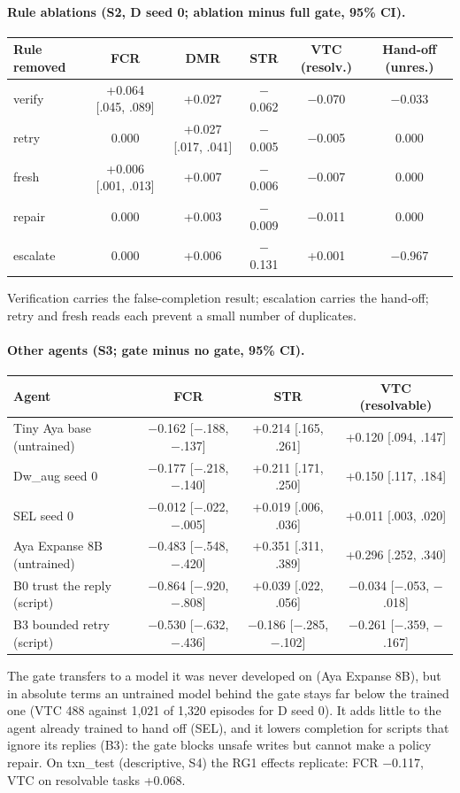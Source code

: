 \documentclass[11pt]{article}
\begin{document}
\paragraph{Rule ablations (S2, D seed 0; ablation minus full gate, 95\% CI).}
\begin{center}\footnotesize
\begin{tabular}{@{}lccccc@{}}
\toprule
Rule removed & FCR & DMR & STR & VTC (resolv.) & Hand-off (unres.) \\
\midrule
verify & +0.064 [.045, .089] & +0.027 & $-$0.062 & $-$0.070 & $-$0.033 \\
retry & 0.000 & +0.027 [.017, .041] & $-$0.005 & $-$0.005 & 0.000 \\
fresh & +0.006 [.001, .013] & +0.007 & $-$0.006 & $-$0.007 & 0.000 \\
repair & 0.000 & +0.003 & $-$0.009 & $-$0.011 & 0.000 \\
escalate & 0.000 & +0.006 & $-$0.131 & +0.001 & $-$0.967 \\
\bottomrule
\end{tabular}
\end{center}
Verification carries the false-completion result; escalation carries the hand-off; retry and fresh reads each prevent
a small number of duplicates.

\paragraph{Other agents (S3; gate minus no gate, 95\% CI).}
\begin{center}\footnotesize
\begin{tabular}{@{}lccc@{}}
\toprule
Agent & FCR & STR & VTC (resolvable) \\
\midrule
Tiny Aya base (untrained) & $-$0.162 [$-$.188, $-$.137] & +0.214 [.165, .261] & +0.120 [.094, .147] \\
Dw\_aug seed 0 & $-$0.177 [$-$.218, $-$.140] & +0.211 [.171, .250] & +0.150 [.117, .184] \\
SEL seed 0 & $-$0.012 [$-$.022, $-$.005] & +0.019 [.006, .036] & +0.011 [.003, .020] \\
Aya Expanse 8B (untrained) & $-$0.483 [$-$.548, $-$.420] & +0.351 [.311, .389] & +0.296 [.252, .340] \\
B0 trust the reply (script) & $-$0.864 [$-$.920, $-$.808] & +0.039 [.022, .056] & $-$0.034 [$-$.053, $-$.018] \\
B3 bounded retry (script) & $-$0.530 [$-$.632, $-$.436] & $-$0.186 [$-$.285, $-$.102] & $-$0.261 [$-$.359, $-$.167] \\
\bottomrule
\end{tabular}
\end{center}
The gate transfers to a model it was never developed on (Aya Expanse 8B), but in absolute terms an untrained model
behind the gate stays far below the trained one (VTC 488 against 1{,}021 of 1{,}320 episodes for D seed 0). It adds
little to the agent already trained to hand off (SEL), and it lowers completion for scripts that ignore its replies
(B3): the gate blocks unsafe writes but cannot make a policy repair. On txn\_test (descriptive, S4) the RG1 effects
replicate: FCR $-$0.117, VTC on resolvable tasks +0.068.
\end{document}
